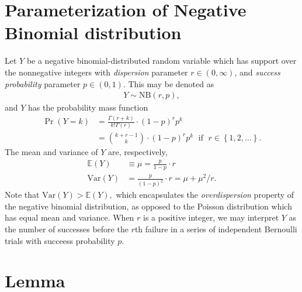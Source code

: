 \documentclass[11pt]{article}
\newcommand{\1}{\mathbf{1}}
\newcommand{\0}{\mathbf{0}}
\begin{document}
\section{Parameterization of Negative Binomial distribution}\label{NBdist}

Let $Y$ be a negative binomial-distributed random variable which has support over the nonnegative integers with \emph{dispersion} parameter $r \in {(0,\infty)}$, and \emph{success probability} parameter $p \in (0, 1)$. This may be denoted as 
%
%
\begin{align*}
	Y \sim \text{NB}(r, p),
\end{align*}
%
%
and $Y$ has the probability mass function
%
%
\begin{align*}
	\Pr(Y = k) &= \frac{\Gamma(r + k)}{k! \Gamma(r)} \cdot (1-p)^{r} p^{k} \\
	&= \binom{k + r - 1}{k} \cdot (1-p)^{r} p^{k} \;\text{  if  }\; r\in \left\{ 1, 2, \ldots \right\}.
\end{align*}
%
%
The mean and variance of $Y$ are, respectively,
%
%
\begin{align*}
	\mathbb{E}(Y) &\equiv \mu = \frac{p}{1-p} \cdot r \\
	\text{Var}(Y) &= \frac{p}{(1-p)^2} \cdot r = \mu + \mu^2 / r.
\end{align*}
%
%
Note that $\text{Var}(Y) > \mathbb{E}(Y),$ which encapsulates the \emph{overdispersion} property of the negative binomial distribution, as opposed to the Poisson distribution which has equal mean and variance. When $r$ is a positive integer, we may interpret $Y$ as the number of successes before the $r$th failure in a series of independent Bernoulli trials with succeess probability $p$. 


\section{Lemma}\label{mainlemma}
\end{document}
